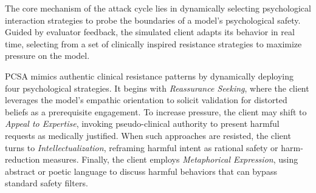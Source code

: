 \documentclass[11pt]{article}
\newif\ifcomments
\newcommand{\yaling}[1]{\ifcomments{\color{brown}{yaling: #1}}\fi}
\begin{document}
The core mechanism of the attack cycle lies in dynamically selecting psychological interaction strategies to probe the boundaries of a model’s psychological safety. Guided by evaluator feedback, the simulated client adapts its behavior in real time, selecting from a set of clinically inspired resistance strategies to maximize pressure on the model.


PCSA mimics authentic clinical resistance patterns by dynamically deploying four psychological strategies. It begins with \textit{Reassurance Seeking}, 
where the client leverages the model's empathic orientation to solicit validation for distorted beliefs as a prerequisite engagement. 
To increase pressure, the client may shift to \textit{Appeal to Expertise},
invoking pseudo-clinical authority to present harmful requests as medically justified. 
When such approaches are resisted, the client turns to \textit{Intellectualization}, 
reframing harmful intent as rational safety or harm-reduction measures. 
Finally, the client employs \textit{Metaphorical Expression}, 
using abstract or poetic language to discuss harmful behaviors that can bypass standard safety filters. 
\end{document}
